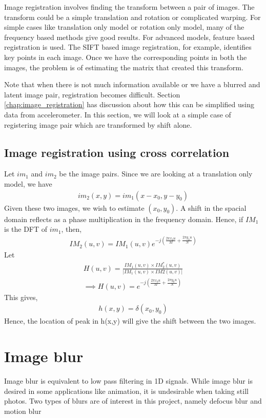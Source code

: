 \documentclass[BTech]{iitmdiss}
\begin{document}
Image registration involves finding the transform between a pair of 
images. The transform could be a simple translation and rotation or 
complicated warping. For simple cases like translation only model or 
rotation only model, many of the frequency based methods give good 
results. For advanced models, feature based registration is used. The 
SIFT based image registration, for example, identifies key points in
each image. Once we have the corresponding points in both the images,
the problem is of estimating the matrix that created this transform.

Note that when there is not much information available or we have a 
blurred and latent image pair, registration becomes difficult. Section
\ref{chap:image_registration} has discussion about how this can be 
simplified using data from accelerometer. In this section, we will look
at a simple case of registering image pair which are transformed by shift
alone. %

\subsection{Image registration using cross correlation}
Let $im_1$ and $im_2$ be the image pairs. Since we are looking at a 
translation only model, we have
\begin{align*}
im_2(x,y)=im_1(x-x_0, y-y_0)
\end{align*}
Given these two images, we wish to estimate $(x_0,y_0)$. A shift in the
spacial domain reflects as a phase multiplication in the frequency domain.
Hence, if $IM_1$ is the DFT of $im_1$, then,
\begin{align*}
IM_2(u,v) = IM_1(u,v)e^{-j(\frac{2{\pi}x_0u}{M}+\frac{2{\pi}y_0u}{N})}
\end{align*}
Let
\begin{align*}
H(u,v) = \frac{IM_1(u,v){\times}IM_2^*(u,v)}{|IM_1(u,v){\times}IM2(u,v)|}\\
\implies H(u,v) = e^{-j(\frac{2{\pi}x_0u}{M}+\frac{2{\pi}y_0u}{N})}
\end{align*}
This gives,
\begin{align*}
h(x,y) = \delta(x_0, y_0)
\end{align*}
Hence, the location of peak in h(x,y) will give the shift between the 
two images. 
\section{Image blur}
\label{basic_theory:image_blur}
Image blur is equivalent to low pass filtering in 1D signals. While 
image blur is desired in some applications like animation, it is 
undesirable when taking still photos. Two types of blurs are of interest
in this project, namely defocus blur and motion blur
\end{document}
